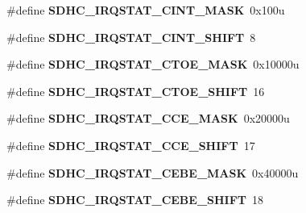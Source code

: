 \begin{DoxyCompactItemize}
\item 
\#define {\bfseries S\+D\+H\+C\+\_\+\+I\+R\+Q\+S\+T\+A\+T\+\_\+\+C\+I\+N\+T\+\_\+\+M\+A\+SK}~0x100u\hypertarget{group__SDHC__Register__Masks_ga2d0fb2d9616c809a5610a537d015ddb6}{}\label{group__SDHC__Register__Masks_ga2d0fb2d9616c809a5610a537d015ddb6}

\item 
\#define {\bfseries S\+D\+H\+C\+\_\+\+I\+R\+Q\+S\+T\+A\+T\+\_\+\+C\+I\+N\+T\+\_\+\+S\+H\+I\+FT}~8\hypertarget{group__SDHC__Register__Masks_gaf1eb220f726f19220232275f4ba4c42b}{}\label{group__SDHC__Register__Masks_gaf1eb220f726f19220232275f4ba4c42b}

\item 
\#define {\bfseries S\+D\+H\+C\+\_\+\+I\+R\+Q\+S\+T\+A\+T\+\_\+\+C\+T\+O\+E\+\_\+\+M\+A\+SK}~0x10000u\hypertarget{group__SDHC__Register__Masks_gac60476a4a3d496ff5f2527af5bbeb006}{}\label{group__SDHC__Register__Masks_gac60476a4a3d496ff5f2527af5bbeb006}

\item 
\#define {\bfseries S\+D\+H\+C\+\_\+\+I\+R\+Q\+S\+T\+A\+T\+\_\+\+C\+T\+O\+E\+\_\+\+S\+H\+I\+FT}~16\hypertarget{group__SDHC__Register__Masks_gac22f4d05d6dd0b5bb27ac12636e46180}{}\label{group__SDHC__Register__Masks_gac22f4d05d6dd0b5bb27ac12636e46180}

\item 
\#define {\bfseries S\+D\+H\+C\+\_\+\+I\+R\+Q\+S\+T\+A\+T\+\_\+\+C\+C\+E\+\_\+\+M\+A\+SK}~0x20000u\hypertarget{group__SDHC__Register__Masks_ga1d6ab12c7170114b3836f7dfd0cb085a}{}\label{group__SDHC__Register__Masks_ga1d6ab12c7170114b3836f7dfd0cb085a}

\item 
\#define {\bfseries S\+D\+H\+C\+\_\+\+I\+R\+Q\+S\+T\+A\+T\+\_\+\+C\+C\+E\+\_\+\+S\+H\+I\+FT}~17\hypertarget{group__SDHC__Register__Masks_gaf568e7274912a3580885d9852483470f}{}\label{group__SDHC__Register__Masks_gaf568e7274912a3580885d9852483470f}

\item 
\#define {\bfseries S\+D\+H\+C\+\_\+\+I\+R\+Q\+S\+T\+A\+T\+\_\+\+C\+E\+B\+E\+\_\+\+M\+A\+SK}~0x40000u\hypertarget{group__SDHC__Register__Masks_ga3176b0a0930022da225cbb55238688da}{}\label{group__SDHC__Register__Masks_ga3176b0a0930022da225cbb55238688da}

\item 
\#define {\bfseries S\+D\+H\+C\+\_\+\+I\+R\+Q\+S\+T\+A\+T\+\_\+\+C\+E\+B\+E\+\_\+\+S\+H\+I\+FT}~18\hypertarget{group__SDHC__Register__Masks_ga0163cd5133f9fcd057aae342144534d1}{}\label{group__SDHC__Register__Masks_ga0163cd5133f9fcd057aae342144534d1}


\end{DoxyCompactItemize}
